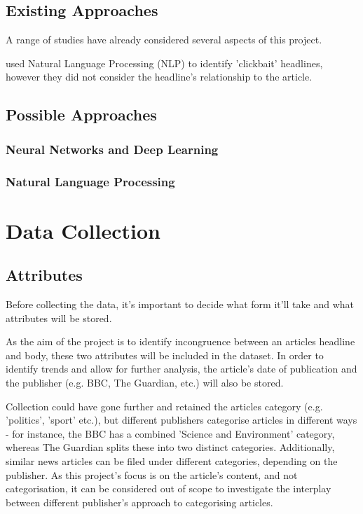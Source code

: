 \documentclass[12pt,a4paper]{article}
\begin{document}
\subsection{Existing Approaches}
A range of studies have already considered several aspects of this project.

 used Natural Language Processing (NLP) to identify 'clickbait' headlines, however they did not consider the headline's relationship to the article.


\subsection{Possible Approaches}
\subsubsection{Neural Networks and Deep Learning}
\subsubsection{Natural Language Processing}

\section{Data Collection}

\subsection{Attributes}
Before collecting the data, it's important to decide what form it'll take and what attributes will be stored.

As the aim of the project is to identify incongruence between an articles headline and body, these two attributes will be included in the dataset. In order to identify trends and allow for further analysis, the article's date of publication and the publisher (e.g. BBC, The Guardian, etc.) will also be stored.

Collection could have gone further and retained the articles category (e.g. 'politics', 'sport' etc.), but different publishers categorise articles in different ways - for instance, the BBC has a combined 'Science and Environment' category, whereas The Guardian splits these into two distinct categories. Additionally, similar news articles can be filed under different categories, depending on the publisher. As this project's focus is on the article's content, and not categorisation, it can be considered out of scope to investigate the interplay between different publisher's approach to categorising articles.
\end{document}
